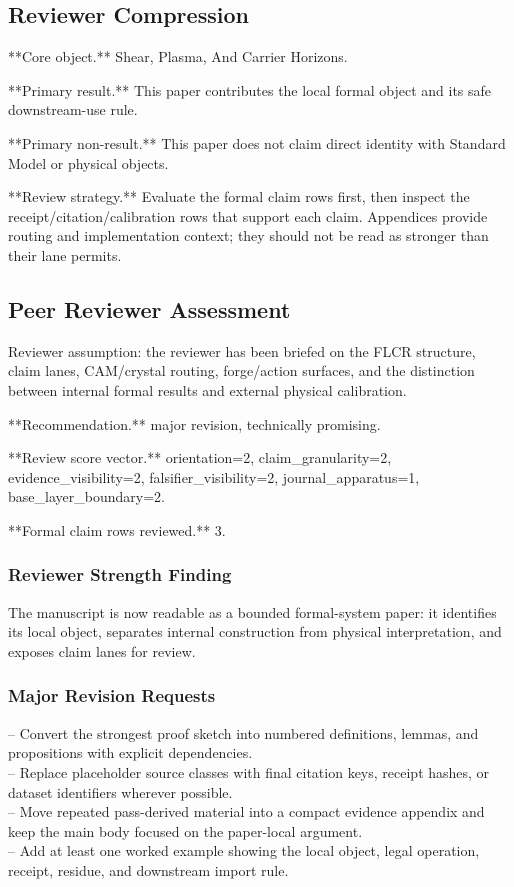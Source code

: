 \documentclass[11pt]{article}
\begin{document}
\subsection*{Reviewer Compression}

**Core object.** Shear, Plasma, And Carrier Horizons.

**Primary result.** This paper contributes the local formal object and its safe downstream-use rule.

**Primary non-result.** This paper does not claim direct identity with Standard Model or physical objects.

**Review strategy.** Evaluate the formal claim rows first, then inspect the receipt/citation/calibration rows that support each claim. Appendices provide routing and implementation context; they should not be read as stronger than their lane permits.

\subsection*{Peer Reviewer Assessment}

Reviewer assumption: the reviewer has been briefed on the FLCR structure, claim lanes, CAM/crystal routing, forge/action surfaces, and the distinction between internal formal results and external physical calibration.

**Recommendation.** major revision, technically promising.

**Review score vector.** orientation=2, claim\_granularity=2, evidence\_visibility=2, falsifier\_visibility=2, journal\_apparatus=1, base\_layer\_boundary=2.

**Formal claim rows reviewed.** 3.

\subsubsection*{Reviewer Strength Finding}

The manuscript is now readable as a bounded formal-system paper: it identifies its local object, separates internal construction from physical interpretation, and exposes claim lanes for review.

\subsubsection*{Major Revision Requests}

\noindent{}-- Convert the strongest proof sketch into numbered definitions, lemmas, and propositions with explicit dependencies.\\
\noindent{}-- Replace placeholder source classes with final citation keys, receipt hashes, or dataset identifiers wherever possible.\\
\noindent{}-- Move repeated pass-derived material into a compact evidence appendix and keep the main body focused on the paper-local argument.\\
\noindent{}-- Add at least one worked example showing the local object, legal operation, receipt, residue, and downstream import rule.\\
\end{document}
